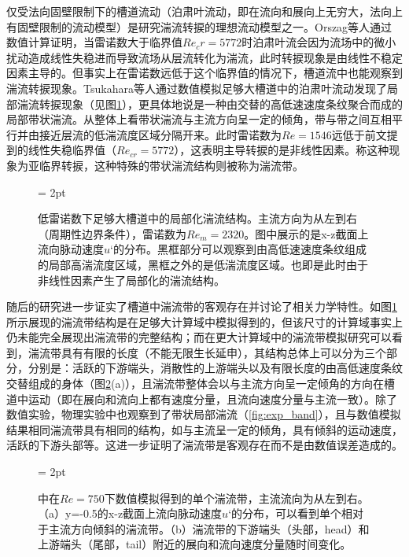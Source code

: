 仅受法向固壁限制下的槽道流动（泊肃叶流动，即在流向和展向上无穷大，法向上有固壁限制的流动模型）是研究湍流转捩的理想流动模型之一。Orszag等人通过数值计算证明，当雷诺数大于临界值$Re_cr = 5772$时泊肃叶流会因为流场中的微小扰动造成线性失稳进而导致流场从层流转化为湍流，此时转捩现象是由线性不稳定因素\cite{orszag_1971}主导的。但事实上在雷诺数远低于这个临界值的情况下，槽道流中也能观察到湍流转捩现象。Tsukahara等人通过数值模拟足够大槽道中的泊肃叶流动发现了局部湍流转捩现象\cite{Tsukahara2005DNSOT}（见图\ref{fig:2005band}），更具体地说是一种由交替的高低速速度条纹聚合而成的局部带状湍流。从整体上看带状湍流与主流方向呈一定的倾角，带与带之间互相平行并由接近层流的低湍流度区域分隔开来。此时雷诺数为$Re = 1546$远低于前文提到的线性失稳临界值（$Re_{cr} = 5772$），这表明主导转捩的是非线性因素。称这种现象为亚临界转捩，这种特殊的带状湍流结构则被称为湍流带。

\begin{figure}[H]
	\subfigbottomskip = 2pt
	\begin{minipage}[h]{\linewidth}
	\centering
	\end{minipage}
	\quad
	\caption{低雷诺数下足够大槽道中的局部化湍流结构\cite{Tsukahara2005DNSOT}。主流方向为从左到右（周期性边界条件），雷诺数为$Re_m = 2320$。图中展示的是x-z截面上流向脉动速度$u‘$的分布。黑框部分可以观察到由高低速速度条纹组成的局部高湍流度区域，黑框之外的是低湍流度区域。也即是此时由于非线性因素产生了局部化的湍流结构。}
\label{fig:2005band}
\end{figure}

随后的研究\cite{TsukaharaKawaguchi2014, Tuckerman2014, Xiong2015, Tao2018, Kanazawa2018, Paranjape2019, Shimizu2019, Paranjape2020, Tuckerman2020, Liu2020, Duguet2020}进一步证实了槽道中湍流带的客观存在并讨论了相关力学特性。如图\ref{fig:2005band}所示展现的湍流带结构是在足够大计算域中模拟得到的，但该尺寸的计算域事实上仍未能完全展现出湍流带的完整结构；而在更大计算域中的湍流带模拟研究\cite{Xiong2015, Tao2018, Kanazawa2018, Paranjape2019, Shimizu2019}可以看到，湍流带具有有限的长度（不能无限生长延申），其结构总体上可以分为三个部分，分别是：活跃的下游端头，消散性的上游端头以及有限长度的由高低速度条纹交替组成的身体（图\ref{fig:num_band}(a)），且湍流带整体会以与主流方向呈一定倾角的方向在槽道中运动（即在展向和流向上都有速度分量，且流向速度分量与主流一致）。除了数值实验，物理实验中也观察到了带状局部湍流（\ref{fig:exp_band}），且与数值模拟结果相同湍流带具有相同的结构，如与主流呈一定的倾角，具有倾斜的运动速度，活跃的下游头部等。这进一步证明了湍流带是客观存在而不是由数值误差造成的。
\begin{figure}[htb]
	\subfigbottomskip = 2pt
	\begin{minipage}[h]{\linewidth}
	\centering
	\end{minipage}
	\quad
	\caption{中在$Re = 750$下数值模拟得到的单个湍流带，主流流向为从左到右\cite{Xiao2020}。（a）y=-0.5的x-z截面上流向脉动速度$u‘$的分布，可以看到单个相对于主流方向倾斜的湍流带。（b）湍流带的下游端头（头部，head）和上游端头（尾部，tail）附近的展向和流向速度分量随时间变化。}
\label{fig:num_band}
\end{figure}


